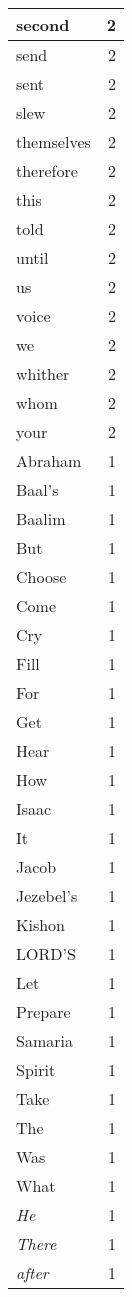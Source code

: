 \begin{center}
\begin{longtable}{l|r}
second & 2 \\ \hline
send & 2 \\ \hline
sent & 2 \\ \hline
slew & 2 \\ \hline
themselves & 2 \\ \hline
therefore & 2 \\ \hline
this & 2 \\ \hline
told & 2 \\ \hline
until & 2 \\ \hline
us & 2 \\ \hline
voice & 2 \\ \hline
we & 2 \\ \hline
whither & 2 \\ \hline
whom & 2 \\ \hline
your & 2 \\ \hline
Abraham & 1 \\ \hline
Baal's & 1 \\ \hline
Baalim & 1 \\ \hline
But & 1 \\ \hline
Choose & 1 \\ \hline
Come & 1 \\ \hline
Cry & 1 \\ \hline
Fill & 1 \\ \hline
For & 1 \\ \hline
Get & 1 \\ \hline
Hear & 1 \\ \hline
How & 1 \\ \hline
Isaac & 1 \\ \hline
It & 1 \\ \hline
Jacob & 1 \\ \hline
Jezebel's & 1 \\ \hline
Kishon & 1 \\ \hline
LORD'S & 1 \\ \hline
Let & 1 \\ \hline
Prepare & 1 \\ \hline
Samaria & 1 \\ \hline
Spirit & 1 \\ \hline
Take & 1 \\ \hline
The & 1 \\ \hline
Was & 1 \\ \hline
What & 1 \\ \hline
\emph{He} & 1 \\ \hline
\emph{There} & 1 \\ \hline
\emph{after} & 1 \\ \hline

\end{longtable}
\end{center}

